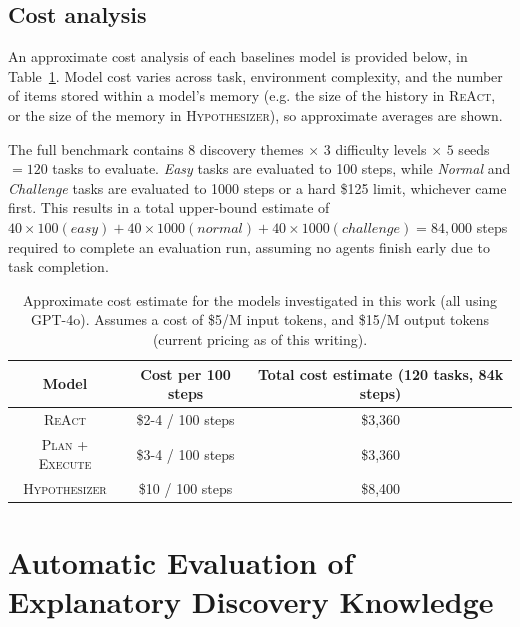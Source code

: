 \subsection{Cost analysis}
\label{sec:appendix_cost_analysis}

An approximate cost analysis of each baselines model is provided below, in Table~\ref{tab:cost-estimate}.  Model cost varies across task, environment complexity, and the number of items stored within a model's memory (e.g. the size of the history in \textsc{ReAct}, or the size of the memory in \textsc{Hypothesizer}), so approximate averages are shown. 

The full benchmark contains $8$ discovery themes $\times$ $3$ difficulty levels $\times$ $5$ seeds $= 120$ tasks to evaluate.  \textit{Easy} tasks are evaluated to 100 steps, while \textit{Normal} and \textit{Challenge} tasks are evaluated to 1000 steps or a hard \$125 limit, whichever came first.  This results in a total upper-bound estimate of $40\times100 (easy) + 40\times1000 (normal) + 40\times1000(challenge) = 84,000$ steps required to complete an evaluation run, assuming no agents finish early due to task completion.

\begin{table}[h!]
    \centering
    \footnotesize
    \caption{Approximate cost estimate for the models investigated in this work (all using GPT-4o). Assumes a cost of \$5/M input tokens, and \$15/M output tokens (current pricing as of this writing).}
    \label{tab:cost-estimate}
    \begin{tabular}{ccc}
    \toprule
    \textbf{Model}  &   \textbf{Cost per 100 steps}  &   \textbf{Total cost estimate (120 tasks, 84k steps)} \\
    \midrule
        \textsc{ReAct}               &  \$2-4 / 100 steps       &   \$3,360 \\
        \textsc{Plan + Execute}      &  \$3-4 / 100 steps       &   \$3,360 \\
        \textsc{Hypothesizer}        &  \$10  / 100 steps       &   \$8,400 \\
    \bottomrule
    \end{tabular}
\end{table}

\section{Automatic Evaluation of Explanatory Discovery Knowledge}
\label{sec:appendix-automatic-knowledge-evaluation}

